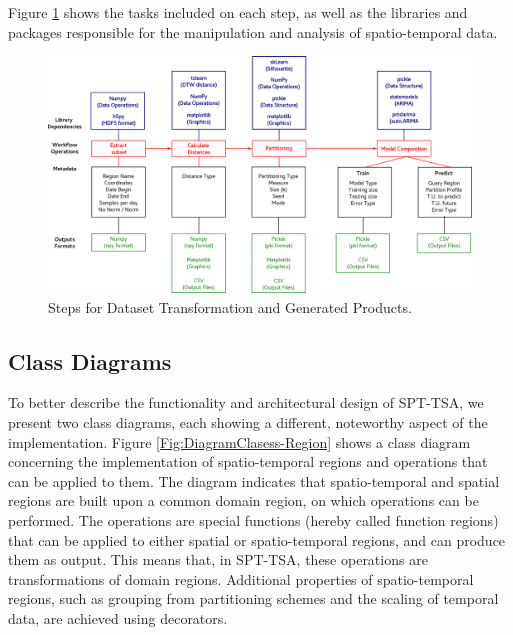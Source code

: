 Figure \ref{Fig:Steps-Data-Transformation} shows the tasks included on each step, as well as the libraries and packages responsible for the manipulation and analysis of spatio-temporal data.

\begin{figure}[tp]
	\centering
	\includegraphics[scale=0.25, angle=90]{../Figures/workflow_data_operations}
	\caption{Steps for Dataset Transformation and Generated Products.}	
	\label{Fig:Steps-Data-Transformation}	 		
\end{figure}


\subsection{Class Diagrams}
\label{Sec:SPT-TSAClassDiagrams}

To better describe the functionality and architectural design of SPT-TSA, we present two class diagrams, each showing a different, noteworthy aspect of the implementation. Figure \ref{Fig:DiagramClasess-Region} shows a class diagram concerning the implementation of spatio-temporal regions and operations that can be applied to them. The diagram indicates that spatio-temporal and spatial regions are built upon a common domain region, on which operations can be performed. The operations are special functions (hereby called function regions) that can be applied to either spatial or spatio-temporal regions, and can produce them as output. This means that, in SPT-TSA, these operations are transformations of domain regions. Additional properties of spatio-temporal regions, such as grouping from partitioning schemes and the scaling of temporal data, are achieved using decorators.

